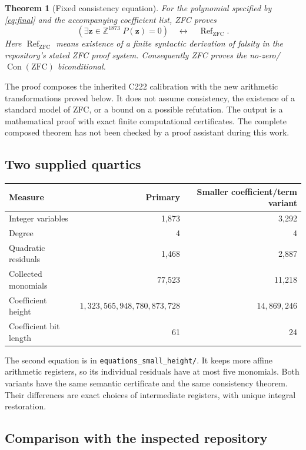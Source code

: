 \documentclass[11pt]{article}
\newtheorem{theorem}{Theorem}[section]
\theoremstyle{definition}
\theoremstyle{remark}
\newcommand{\ZZ}{\mathbb Z}
\newcommand{\Con}{\operatorname{Con}}
\newcommand{\Refut}{\operatorname{Ref}}
\newcommand{\File}[1]{\nolinkurl{#1}}
\begin{document}
\begin{theorem}[Fixed consistency equation]\label{thm:main}
For the polynomial specified by \eqref{eq:final} and the accompanying
coefficient list, ZFC proves
\[
 (\exists\mathbf z\in\ZZ^{1873}\;P(\mathbf z)=0)
 \quad\longleftrightarrow\quad \Refut_{\mathrm{ZFC}}.
\]
Here $\Refut_{\mathrm{ZFC}}$ means existence of a finite syntactic derivation
of falsity in the repository's stated ZFC proof system. Consequently ZFC
proves the no-zero/$\Con(\mathrm{ZFC})$ biconditional.
\end{theorem}

The proof composes the inherited C222 calibration with the new arithmetic
transformations proved below. It does not assume consistency, the existence
of a standard model of ZFC, or a bound on a possible refutation.
The output is a mathematical proof with exact finite computational
certificates. The complete composed theorem has not been checked by a
proof assistant during this work.

\subsection{Two supplied quartics}

\begin{center}\small
\begin{tabular}{lrr}
\toprule
Measure & Primary & Smaller coefficient/term variant\\
\midrule
Integer variables & 1,873 & 3,292\\
Degree & 4 & 4\\
Quadratic residuals & 1,468 & 2,887\\
Collected monomials & 77,523 & 11,218\\
Coefficient height & $1{,}323{,}565{,}948{,}780{,}873{,}728$ & $14{,}869{,}246$\\
Coefficient bit length & 61 & 24\\
\bottomrule
\end{tabular}
\end{center}

The second equation is in \File{equations_small_height/}. It keeps more
affine arithmetic registers, so its individual residuals have at most
five monomials. Both variants have the same semantic certificate and
the same consistency theorem. Their differences are exact choices of
intermediate registers, with unique integral restoration.

\subsection{Comparison with the inspected repository}
\end{document}
